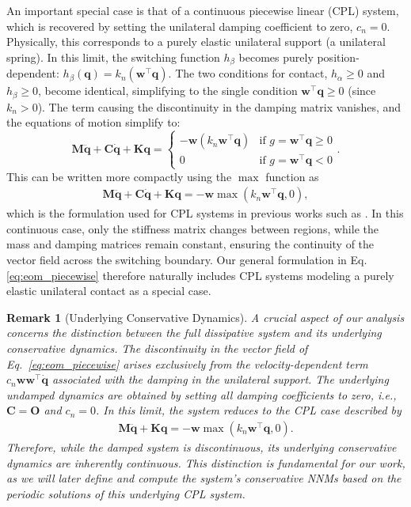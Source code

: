 \documentclass[a4paper,9pt,parskip=half,english]{article}
\theoremstyle{plain}
\newtheorem{remark}[theorem]{Remark}
\theoremstyle{definition}
\newcommand{\T}{^{\!\top}} %
\newcommand{\vq}{\mathbf q}
\newcommand{\vw}{\mathbf w}
\newcommand{\vC}{\mathbf C}
\newcommand{\vK}{\mathbf K}
\newcommand{\vM}{\mathbf M}
\newcommand{\vO}{\mathbf O}
\begin{document}
An important special case is that of a continuous piecewise linear (CPL) system, which is recovered by setting the unilateral damping coefficient to zero, $c_n = 0$. Physically, this corresponds to a purely elastic unilateral support (a unilateral spring). In this limit, the switching function $h_{\beta}$ becomes purely position-dependent: $h_{\beta}(\vq) = k_n(\vw\T\vq)$. The two conditions for contact, $h_{\alpha} \ge 0$ and $h_{\beta} \ge 0$, become identical, simplifying to the single condition $\vw\T\vq \ge 0$ (since $k_n > 0$). The term causing the discontinuity in the damping matrix vanishes, and the equations of motion simplify to:
\begin{equation}\label{eq:eom_damp_CPL}
	\vM\ddot{\vq} + \vC\dot{\vq} + \vK\vq = \begin{cases} - \vw (k_n \vw\T\vq) & \text{if } g = \vw\T\vq \geq 0 \\ 0 & \text{if } g = \vw\T\vq < 0 \end{cases}.
\end{equation}
This can be written more compactly using the $\max$ function as
\begin{align}\label{eq:eom_cons_CPL}
	\vM \ddot{\vq} + \vC \dot{\vq} + \vK \vq = - \vw \max( k_n \vw\T\vq, 0),
\end{align}
which is the formulation used for CPL systems in previous works such as \cite{Karoui2025}. In this continuous case, only the stiffness matrix changes between regions, while the mass and damping matrices remain constant, ensuring the continuity of the vector field across the switching boundary. Our general formulation in Eq. \eqref{eq:eom_piecewise} therefore naturally includes CPL systems modeling a purely elastic unilateral contact as a special case.
\begin{remark}[Underlying Conservative Dynamics]
	A crucial aspect of our analysis concerns the distinction between the full dissipative system and its underlying conservative dynamics. The discontinuity in the vector field of Eq.~\eqref{eq:eom_piecewise} arises exclusively from the velocity-dependent term $c_n\vw\vw\T\dot{\vq}$ associated with the damping in the unilateral support. The underlying undamped dynamics are obtained by setting all damping coefficients to zero, i.e., $\vC=\vO$ and $c_n=0$. In this limit, the system reduces to the CPL case described by
	\begin{align}
		\vM \ddot{\vq} + \vK \vq = - \vw \max( k_n \vw\T\vq, 0).
	\end{align}
	Therefore, while the damped system is discontinuous, its underlying conservative dynamics are inherently continuous. This distinction is fundamental for our work, as we will later define and compute the system's \textit{conservative NNMs} based on the periodic solutions of this underlying CPL system.
\end{remark}
\end{document}
